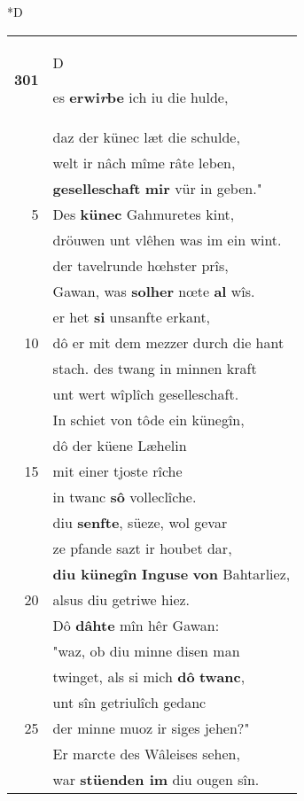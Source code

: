 \documentclass[8pt,a4paper,notitlepage]{article}
\begin{document}
\begin{table}[ht]
\begin{minipage}[t]{0.5\linewidth}
\small
\begin{center}*D
\end{center}
\begin{tabular}{rl}
\textbf{301} & \begin{large}D\end{large}es \textbf{erwi\textit{r}be} ich iu die hulde,\\ 
 & daz der künec læt die schulde,\\ 
 & welt ir nâch mîme râte leben,\\ 
 & \textbf{geselleschaft} \textbf{mir} vür in geben."\\ 
5 & Des \textbf{künec} Gahmuretes kint,\\ 
 & dröuwen unt vlêhen was im ein wint.\\ 
 & der tavelrunde hœhster prîs,\\ 
 & Gawan, was \textbf{solher} nœte \textbf{al} wîs.\\ 
 & er het \textbf{si} unsanfte erkant,\\ 
10 & dô er mit dem mezzer durch die hant\\ 
 & stach. des twang in minnen kraft\\ 
 & unt wert wîplîch geselleschaft.\\ 
 & In schiet von tôde ein künegîn,\\ 
 & dô der küene Læhelin\\ 
15 & mit einer tjoste rîche\\ 
 & in twanc \textbf{sô} volleclîche.\\ 
 & diu \textbf{senfte}, süeze, wol gevar\\ 
 & ze pfande sazt ir houbet dar,\\ 
 & \textbf{diu künegîn} \textbf{Inguse} \textbf{von} Bahtarliez,\\ 
20 & alsus diu getriwe hiez.\\ 
 & Dô \textbf{dâhte} mîn hêr Gawan:\\ 
 & "waz, ob diu minne disen man\\ 
 & twinget, als si mich \textbf{dô} \textbf{twanc},\\ 
 & unt sîn getriulîch gedanc\\ 
25 & der minne muoz ir siges jehen?"\\ 
 & Er marcte des Wâleises sehen,\\ 
 & war \textbf{stüenden im} diu ougen sîn.\\ 

\end{tabular}
\end{minipage}
\end{table}
\end{document}
